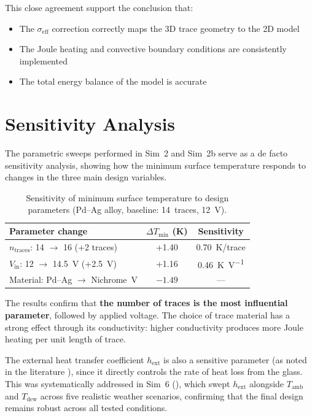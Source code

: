 This close agreement support the conclusion that:
\begin{itemize}
    \item The $\sigma_\text{eff}$ correction correctly maps the 3D trace geometry to the 2D model
    \item The Joule heating and convective boundary conditions are consistently implemented
    \item The total energy balance of the model is accurate
\end{itemize}


\section{Sensitivity Analysis}
\label{sec:sensitivity}

The parametric sweeps performed in Sim~2 and Sim~2b serve as a de facto sensitivity analysis, showing how the minimum surface temperature responds to changes in the three main design variables.

\begin{table}[H]
    \centering
    \caption{Sensitivity of minimum surface temperature to design parameters (Pd--Ag alloy, baseline: 14~traces, \SI{12}{\volt}).}
    \label{tab:sensitivity}
    \begin{tabular}{@{}lcc@{}}
        \toprule
        \textbf{Parameter change} & $\Delta T_\text{min}$ \textbf{(K)} & \textbf{Sensitivity} \\
        \midrule
        $n_\text{traces}$: 14 $\to$ 16 (+2 traces) & +1.40 & \SI{0.70}{\kelvin}/trace \\
        $V_\text{in}$: 12 $\to$ \SI{14.5}{\volt} (+\SI{2.5}{\volt}) & +1.16 & \SI{0.46}{\kelvin\per\volt} \\
        Material: Pd--Ag $\to$ Nichrome~V & $-1.49$ & --- \\
        \bottomrule
    \end{tabular}
\end{table}

The results confirm that \textbf{the number of traces is the most influential parameter}, followed by applied voltage. The choice of trace material has a strong effect through its conductivity: higher conductivity produces more Joule heating per unit length of trace.

The external heat transfer coefficient $h_\text{ext}$ is also a sensitive parameter (as noted in the literature \cite{hozejowska2019}), since it directly controls the rate of heat loss from the glass. This was systematically addressed in Sim~6 (), which swept $h_\text{ext}$ alongside $T_\text{amb}$ and $T_\text{dew}$ across five realistic weather scenarios, confirming that the final design remains robust across all tested conditions.
